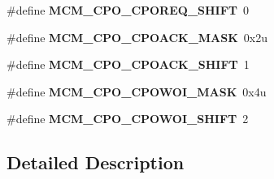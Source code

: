 \begin{DoxyCompactItemize}
\#define {\bfseries M\+C\+M\+\_\+\+C\+P\+O\+\_\+\+C\+P\+O\+R\+E\+Q\+\_\+\+S\+H\+I\+FT}~0
\item 
\mbox{\label{group___m_c_m___register___masks_ga039f47e9952c17908e79eace8fd0139c}} 
\#define {\bfseries M\+C\+M\+\_\+\+C\+P\+O\+\_\+\+C\+P\+O\+A\+C\+K\+\_\+\+M\+A\+SK}~0x2u
\item 
\mbox{\label{group___m_c_m___register___masks_gaa9a8977b3a452ae07fb7ca851c5ee47e}} 
\#define {\bfseries M\+C\+M\+\_\+\+C\+P\+O\+\_\+\+C\+P\+O\+A\+C\+K\+\_\+\+S\+H\+I\+FT}~1
\item 
\mbox{\label{group___m_c_m___register___masks_ga154f71ae507ca3bac1e2c2a9dbd1dcd5}} 
\#define {\bfseries M\+C\+M\+\_\+\+C\+P\+O\+\_\+\+C\+P\+O\+W\+O\+I\+\_\+\+M\+A\+SK}~0x4u
\item 
\mbox{\label{group___m_c_m___register___masks_ga369c1ed9bf00d8317ea868b2ea1b0572}} 
\#define {\bfseries M\+C\+M\+\_\+\+C\+P\+O\+\_\+\+C\+P\+O\+W\+O\+I\+\_\+\+S\+H\+I\+FT}~2
\end{DoxyCompactItemize}


\subsection{Detailed Description}
